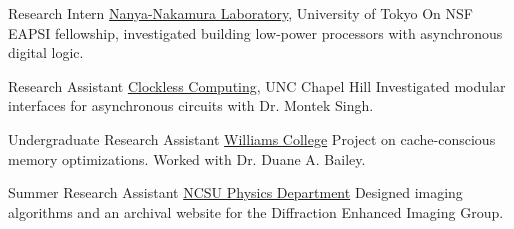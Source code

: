 		{Research Intern}
		{\href{http://www.hal.rcast.u-tokyo.ac.jp/}{Nanya-Nakamura Laboratory}, University of Tokyo}{}{}
		{On NSF EAPSI fellowship, investigated building low-power processors with asynchronous digital logic.}

		{Research Assistant}
		{\href{http://www.cs.unc.edu/~montek/}{Clockless Computing}, UNC Chapel Hill}{}{}
		{Investigated modular interfaces for asynchronous circuits with Dr. Montek Singh.}

		{Undergraduate Research Assistant}
		{\href{http://www.williams.edu}{Williams College}}{}{}
		{Project on cache-conscious memory optimizations.  Worked with Dr. Duane A. Bailey.}

		{Summer Research Assistant}
		{\href{http://physics.ncsu.edu/}{NCSU Physics Department}}{}{}
		{Designed imaging algorithms and an archival website for the Diffraction Enhanced Imaging Group.}
